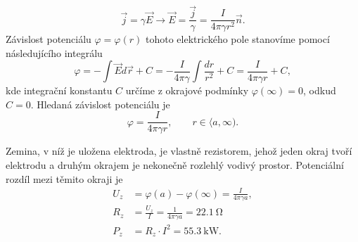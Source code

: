 \begin{mdframed}[style=mdexam]
\begin{example}
    \begin{equation*}
      \vec{j}= \gamma\vec{E}\rightarrow\vec{E}=
      \frac{\vec{j}}{\gamma}=\frac{I}{4\pi\gamma r^2}\vec{n}.
    \end{equation*}
    Závislost potenciálu $\varphi=\varphi(r)$ tohoto elektrického pole stanovíme pomocí
    následujícího integrálu
    \begin{equation}
      \varphi = - \int\vec{E}d\vec{r}+C = -\frac{I}{4\pi\gamma}\int\frac{dr}{r^2} + C 
              =   \frac{I}{4\pi\gamma r} + C, \nonumber
    \end{equation} 
    kde integrační konstantu $C$ určíme z okrajové podmínky $\varphi(\infty)=0$, odkud $C=0$.
    Hledaná závislost potenciálu je
    \begin{equation*}
      \varphi = \frac{I}{4\pi\gamma r}, \qquad r\in\langle a, \infty). 
    \end{equation*}           
    
    Zemina, v níž je uložena elektroda, je vlastně rezistorem, jehož jeden okraj tvoří elektrodu a
    druhým okrajem je nekonečně rozlehlý vodivý prostor. Potenciální rozdíl mezi těmito okraji je
    \begin{align*}
      U_z &= \varphi(a) - \varphi(\infty)= \frac{I}{4\pi\gamma a},             \\
      R_z &= \frac{U_z}{I} = \frac{1}{4\pi\gamma a} = \qty{22,1}{\ohm}          \\ 
      P_z &= R_z\cdot I^2 = \qty{55,3}{\kilo\watt}. 
    \end{align*}
  \end{example}
\end{mdframed}


